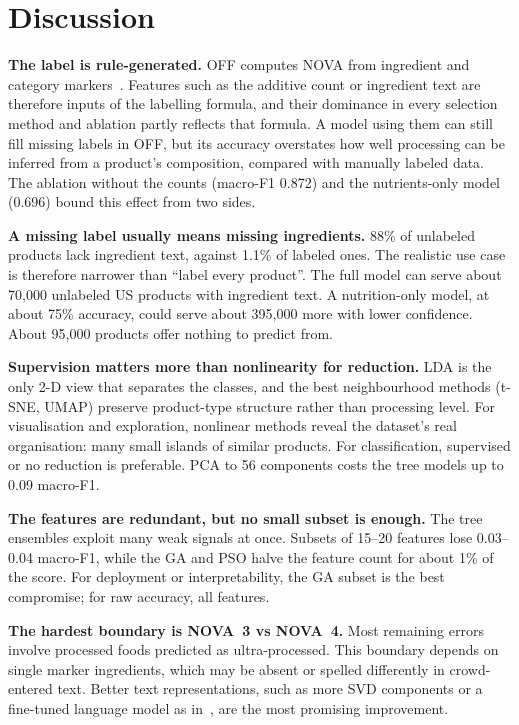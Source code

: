 \documentclass[conference]{IEEEtran}
\begin{document}
\section{Discussion}
\label{sec:discussion}

\textbf{The label is rule-generated.} OFF computes NOVA from ingredient and category markers~\cite{offnova}. Features such as the additive count or ingredient text are therefore inputs of the labelling formula, and their dominance in every selection method and ablation partly reflects that formula. A model using them can still fill missing labels in OFF, but its accuracy overstates how well processing can be inferred from a product's composition, compared with manually labeled data. The ablation without the counts (macro-F1 0.872) and the nutrients-only model (0.696) bound this effect from two sides.

\textbf{A missing label usually means missing ingredients.} 88\% of unlabeled products lack ingredient text, against 1.1\% of labeled ones. The realistic use case is therefore narrower than ``label every product''. The full model can serve about 70,000 unlabeled US products with ingredient text. A nutrition-only model, at about 75\% accuracy, could serve about 395,000 more with lower confidence. About 95,000 products offer nothing to predict from.

\textbf{Supervision matters more than nonlinearity for reduction.} LDA is the only 2-D view that separates the classes, and the best neighbourhood methods (t-SNE, UMAP) preserve product-type structure rather than processing level. For visualisation and exploration, nonlinear methods reveal the dataset's real organisation: many small islands of similar products. For classification, supervised or no reduction is preferable. PCA to 56 components costs the tree models up to 0.09 macro-F1.

\textbf{The features are redundant, but no small subset is enough.} The tree ensembles exploit many weak signals at once. Subsets of 15--20 features lose 0.03--0.04 macro-F1, while the GA and PSO halve the feature count for about 1\% of the score. For deployment or interpretability, the GA subset is the best compromise; for raw accuracy, all features.

\textbf{The hardest boundary is NOVA~3 vs NOVA~4.} Most remaining errors involve processed foods predicted as ultra-processed. This boundary depends on single marker ingredients, which may be absent or spelled differently in crowd-entered text. Better text representations, such as more SVD components or a fine-tuned language model as in~\cite{hu2023nutrients}, are the most promising improvement.
\end{document}
